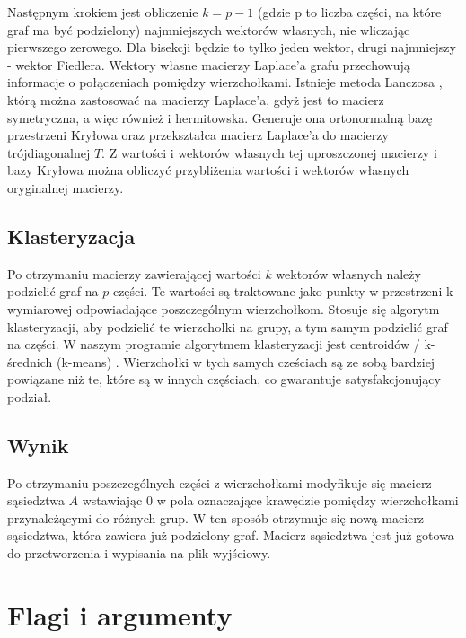 \documentclass{article}
\begin{document}
    Następnym krokiem jest obliczenie \(k = p - 1\) (gdzie p to liczba części, na które graf ma być podzielony) najmniejszych wektorów własnych, nie wliczając pierwszego zerowego. Dla bisekcji będzie to tylko jeden wektor, drugi najmniejszy - wektor Fiedlera. Wektory własne macierzy Laplace'a grafu przechowują informacje o połączeniach pomiędzy wierzchołkami. 
    Istnieje metoda Lanczosa \cite{lanczos}, którą można zastosować na macierzy Laplace'a, gdyż jest to macierz symetryczna, a więc również i hermitowska. Generuje ona ortonormalną bazę przestrzeni Kryłowa oraz przekształca macierz Laplace'a do macierzy trójdiagonalnej \(T\). Z wartości i wektorów własnych tej uproszczonej macierzy i bazy Kryłowa można obliczyć przybliżenia wartości i wektorów własnych oryginalnej macierzy.

    
    
    \subsection{Klasteryzacja}

    Po otrzymaniu macierzy zawierającej wartości \(k\) wektorów własnych należy podzielić graf na \(p\) części. Te wartości są traktowane jako punkty w przestrzeni k-wymiarowej odpowiadające poszczególnym wierzchołkom. Stosuje się algorytm klasteryzacji, aby podzielić te wierzchołki na grupy, a tym samym podzielić graf na części. W naszym programie algorytmem klasteryzacji jest centroidów / k-średnich (k-means) \cite{k-means}. Wierzchołki w tych samych cześciach są ze sobą bardziej powiązane niż te, które są w innych częściach, co gwarantuje satysfakcjonujący podział.



    \subsection{Wynik}

    Po otrzymaniu poszczególnych części z wierzchołkami modyfikuje się macierz sąsiedztwa \(A\) wstawiając 0 w pola oznaczające krawędzie pomiędzy wierzchołkami przynależącymi do różnych grup. W ten sposób otrzymuje się nową macierz sąsiedztwa, która zawiera już podzielony graf. Macierz sąsiedztwa jest już gotowa do przetworzenia i wypisania na plik wyjściowy.
    



\section{Flagi i argumenty}
\end{document}
